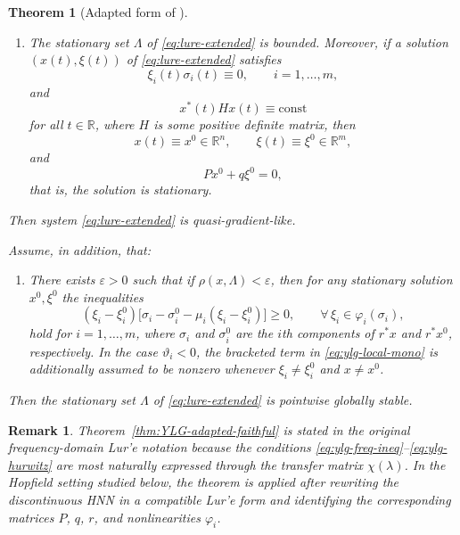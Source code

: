 \documentclass[journal]{IEEEtran}
\theoremstyle{myplain}
\newtheorem{theorem}{Theorem}
\newtheorem{remark}{Remark}
\begin{document}
\begin{theorem}[Adapted form of {\cite[Theorem~3.1]{YLG}}]
\begin{enumerate}
\item[(v)]
The stationary set \(\Lambda\) of \eqref{eq:lure-extended} is bounded.
Moreover, if a solution $(x(t),\xi(t))$ of \eqref{eq:lure-extended}
satisfies
\begin{equation}
  \xi_i(t)\sigma_i(t)\equiv 0,
  \qquad i=1,\dots,m,
  \label{eq:ylg-orthogonality}
\end{equation}
and
\begin{equation}
  x^{*}(t) H x(t)\equiv \mathrm{const}
  \label{eq:ylg-quadratic-const}
\end{equation}
for all \(t\in\mathbb{R}\), where \(H\) is some positive definite matrix,
then
\[
  x(t)\equiv x^0\in\mathbb{R}^n,\qquad
  \xi(t)\equiv \xi^0\in\mathbb{R}^m,
\]
and
\[
  Px^0 + q\xi^0 = 0,
\]
that is, the solution is stationary.
\end{enumerate}

Then system \eqref{eq:lure-extended} is quasi-gradient-like.

Assume, in addition, that:

\begin{enumerate}
\item[(vi)]
There exists \(\varepsilon>0\) such that if \(\rho(x,\Lambda)<\varepsilon\),
then for any stationary solution \(x^0,\xi^0\) the inequalities
\begin{equation}
  (\xi_i-\xi_i^0)
  \bigl[\sigma_i-\sigma_i^0-\mu_i(\xi_i-\xi_i^0)\bigr]\ge 0,
  \qquad
  \forall\,\xi_i\in\varphi_i(\sigma_i),
  \label{eq:ylg-local-mono}
\end{equation}
hold for \(i=1,\dots,m\), where \(\sigma_i\) and \(\sigma_i^0\) are the
\(i\)th components of \(r^{*}x\) and \(r^{*}x^0\), respectively.
In the case \(\vartheta_i<0\), the bracketed term in
\eqref{eq:ylg-local-mono} is additionally assumed to be nonzero whenever
\(\xi_i\neq \xi_i^0\) and \(x\neq x^0\).
\end{enumerate}

Then the stationary set \(\Lambda\) of
\eqref{eq:lure-extended} is pointwise globally stable.
\end{theorem}

\begin{remark}
Theorem~\ref{thm:YLG-adapted-faithful} is stated in the original
frequency-domain Lur'e notation because the conditions
\eqref{eq:ylg-freq-ineq}--\eqref{eq:ylg-hurwitz} are most naturally expressed
through the transfer matrix \(\chi(\lambda)\). In the Hopfield setting studied
below, the theorem is applied after rewriting the discontinuous HNN in a
compatible Lur'e form and identifying the corresponding matrices
\(P\), \(q\), \(r\), and nonlinearities \(\varphi_i\).
\end{remark}
\end{document}
